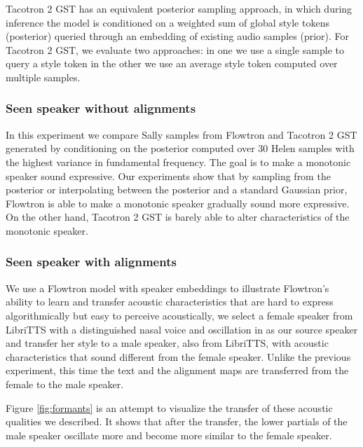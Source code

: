 \documentclass{article}
\begin{document}
Tacotron 2 GST \cite{wang2018style} has an equivalent posterior sampling approach, in which during inference the model is conditioned on a weighted sum of global style tokens (posterior) queried through an embedding of existing audio samples (prior). For Tacotron 2 GST, we evaluate two approaches: in one we use a single sample to query a style token in the other we use an average style token computed over multiple samples.

\subsubsection{Seen speaker without alignments}\label{sec:seen_noalignments}
In this experiment we compare Sally samples from Flowtron and Tacotron 2 GST generated by conditioning on the posterior computed over 30 Helen samples with the highest variance in fundamental frequency. The goal is to make a monotonic speaker sound expressive. Our experiments show that by sampling from the posterior or interpolating between the posterior and a standard Gaussian prior, Flowtron is able to make a monotonic speaker gradually sound more expressive. On the other hand, Tacotron 2 GST is barely able to alter characteristics of the monotonic speaker. 

\subsubsection{Seen speaker with alignments}\label{sec:seen_alignments}
We use a Flowtron model with speaker embeddings to illustrate Flowtron's ability to learn and transfer acoustic characteristics that are hard to express algorithmically but easy to perceive acoustically, we select a female speaker from LibriTTS with a distinguished nasal voice and oscillation in  as our source speaker and transfer her style to a male speaker, also from LibriTTS, with acoustic characteristics that sound different from the female speaker. Unlike the previous experiment, this time the text and the alignment maps are transferred from the female to the male speaker.

Figure \ref{fig:formants} is an attempt to visualize the transfer of these acoustic qualities we described. It shows that after the transfer, the lower partials of the male speaker oscillate more and become more similar to the female speaker.
\end{document}
